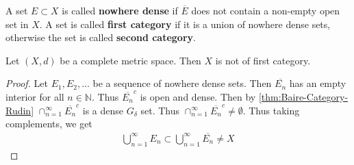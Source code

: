 

\begin{definition}
  A set $E \subset X$ is called \textbf{nowhere dense} if $\overline{E}$ does
  not contain a non-empty open set in $X$. A set is called
  \textbf{first category} if it is a union of nowhere dense sets,
  otherwise the set is called \textbf{second category}.
\end{definition}

\begin{theorem}
  Let $(X, d)$ be a  complete metric space. Then $X$ is not of first category.
\end{theorem}
\begin{proof}
  Let $E_1 , E_2 , \ldots$ be a sequence of nowhere dense sets. Then
  $\overline{E_n}$ has an empty interior for all $n \in \mathbb{N}$.
  Thus $\overline{E_n}^c$ is open and dense. Then by
  \autoref{thm:Baire-Category-Rudin} $\cap_{n =
  1}^{\infty}\overline{E_n}^c$ is a dense $G_\delta$ set. Thus
  $\cap_{n = 1}^{\infty} \overline{E_n}^c \neq \emptyset$. Thus
  taking complements, we get
  \begin{align*}
    \bigcup_{n = 1}^{\infty}E_n \subset \bigcup_{n = 1}^{\infty}
    \overline{E_n} \neq X
  \end{align*}
\end{proof}
